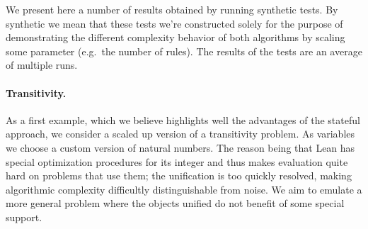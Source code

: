 \documentclass[runningheads]{llncs}
\begin{document}
We present here a number of results obtained by running synthetic tests.
By synthetic we mean that these tests we're constructed solely for the purpose of demonstrating the different complexity behavior of both algorithms by scaling some parameter (e.g.\ the number of rules).
The results of the tests are an average of multiple runs.

\paragraph{Transitivity.}

\begin{figure}
    \label{fig:trans}
    \end{figure}

As a first example, which we believe highlights well the advantages of the stateful approach, we consider a scaled up version of a transitivity problem.
As variables we choose a custom version of natural numbers.
The reason being that Lean has special optimization procedures for its integer and thus makes evaluation quite hard on problems that use them; the unification is too quickly resolved, making algorithmic complexity difficultly distinguishable from noise.
We aim to emulate a more general problem where the objects unified do not benefit of some special support.
\end{document}
